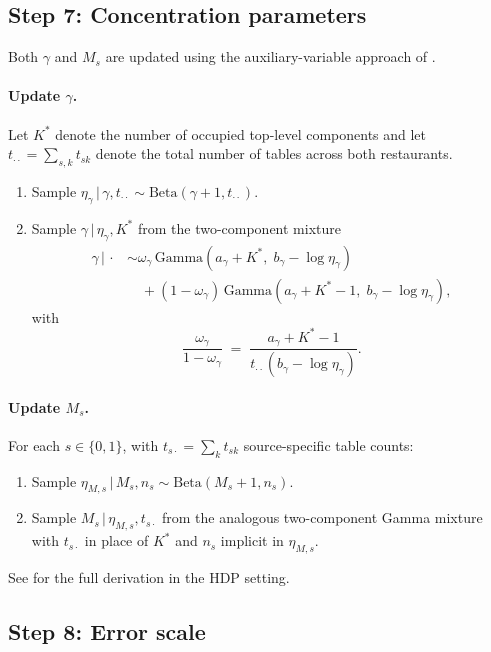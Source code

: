 \documentclass[11pt]{article}
\theoremstyle{plain}
\theoremstyle{definition}
\theoremstyle{remark}
\newcommand{\1}{\mathds{1}}
\newcommand{\given}{\,|\,}
\begin{document}
\subsection{Step 7: Concentration parameters}

Both $\gamma$ and $M_s$ are updated using the auxiliary-variable approach of \citet{escobar1995bayesian}.

\paragraph{Update $\gamma$.} Let $K^*$ denote the number of occupied top-level components and let $t_{\cdot\cdot} = \sum_{s,k} t_{sk}$ denote the total number of tables across both restaurants.
\begin{enumerate}[noitemsep]
\item Sample $\eta_\gamma \given \gamma, t_{\cdot\cdot} \sim \mathrm{Beta}(\gamma + 1, t_{\cdot\cdot})$.
\item Sample $\gamma \given \eta_\gamma, K^*$ from the two-component mixture
\begin{align*}
\gamma \given \cdot &\sim \omega_\gamma\, \mathrm{Gamma}(a_\gamma + K^*,\; b_\gamma - \log \eta_\gamma) \\
&\quad + (1 - \omega_\gamma)\, \mathrm{Gamma}(a_\gamma + K^* - 1,\; b_\gamma - \log \eta_\gamma),
\end{align*}
with
$$\frac{\omega_\gamma}{1 - \omega_\gamma} \;=\; \frac{a_\gamma + K^* - 1}{t_{\cdot\cdot}(b_\gamma - \log \eta_\gamma)}.$$
\end{enumerate}

\paragraph{Update $M_s$.} For each $s \in \{0, 1\}$, with $t_{s\cdot} = \sum_k t_{sk}$ source-specific table counts:
\begin{enumerate}[noitemsep]
\item Sample $\eta_{M,s} \given M_s, n_s \sim \mathrm{Beta}(M_s + 1, n_s)$.
\item Sample $M_s \given \eta_{M,s}, t_{s\cdot}$ from the analogous two-component Gamma mixture with $t_{s\cdot}$ in place of $K^*$ and $n_s$ implicit in $\eta_{M,s}$.
\end{enumerate}
See \citet[Appendix A]{teh2006hierarchical} for the full derivation in the HDP setting.

\subsection{Step 8: Error scale}
\end{document}
